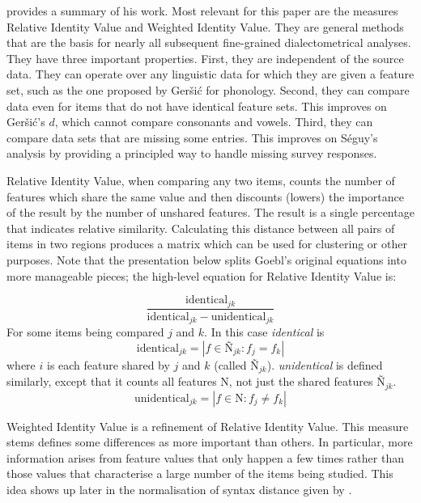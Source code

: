 \documentclass[11pt]{article}
\begin{document}
 provides a summary of his work. Most relevant for
this paper are the measures Relative Identity Value and Weighted
Identity Value. They are general methods that are the basis for nearly
all subsequent fine-grained dialectometrical analyses. They have three
important properties. First, they are independent of the source
data. They can operate over any linguistic data for which they are
given a feature set, such as the one proposed by Ger\v{s}i\'c for
phonology. Second, they can compare data even for items that do not
have identical feature sets. This improves on Ger\v{s}i\'c's $d$,
which cannot compare consonants and vowels. Third, they can compare
data sets that are missing some entries. This improves on S\'eguy's
analysis by providing a principled way to handle missing survey
responses.

Relative Identity Value, when comparing any two items, counts the
number of features which share the same value and then discounts
(lowers) the importance of the result by the number of unshared
features. The result is a single percentage that indicates
relative similarity. Calculating this distance between all pairs
of items in two regions produces a matrix which can be used for
clustering or other purposes. Note that the presentation below splits
Goebl's original equations into more manageable pieces; the high-level
equation for Relative Identity Value is:

\begin{equation}
  \frac{\textrm{identical}_{jk}} {\textrm{identical}_{jk} - \textrm{unidentical}_{jk}}
\label{riv}
\end{equation}
For some items being compared $j$ and $k$. In this case
\textit{identical} is
\begin{equation}
  \textrm{identical}_{jk} = |f \in \textrm{\~N}_{jk} : f_j = f_k|
\end{equation}
where $i$ is each feature shared by $j$ and $k$ (called
$\textrm{\~N}_{jk}$). \textit{unidentical} is defined similarly, except
that it counts all features N, not just the shared features
$\textrm{\~N}_{jk}$.
\begin{equation}
  \textrm{unidentical}_{jk} = |f \in \textrm{N} : f_j \neq f_k|
\end{equation}

Weighted Identity Value is a refinement of Relative Identity
Value. This measure stems defines some differences as more
important than others. In particular, more information arises from
feature values that only happen a few times rather than those values
that characterise a large number of the items being studied.  This
idea shows up later in the normalisation of syntax distance given by
.
\end{document}
